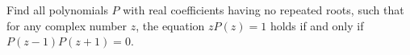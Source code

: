 Find all polynomials $P$ with real coefficients having no repeated roots,
such that for any complex number $z$, the equation $zP(z)=1$ holds if and only if $P(z-1)P(z+1)=0$.
